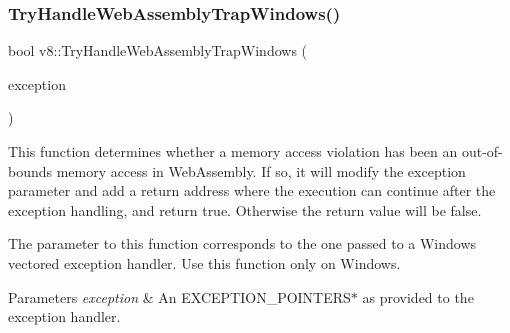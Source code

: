 \subsubsection{\texorpdfstring{Try\+Handle\+Web\+Assembly\+Trap\+Windows()}{TryHandleWebAssemblyTrapWindows()}}
{\footnotesize\ttfamily bool v8\+::\+Try\+Handle\+Web\+Assembly\+Trap\+Windows (\begin{DoxyParamCaption}\item[{E\+X\+C\+E\+P\+T\+I\+O\+N\+\_\+\+P\+O\+I\+N\+T\+E\+RS $\ast$}]{exception }\end{DoxyParamCaption})}

This function determines whether a memory access violation has been an out-\/of-\/bounds memory access in Web\+Assembly. If so, it will modify the exception parameter and add a return address where the execution can continue after the exception handling, and return true. Otherwise the return value will be false.

The parameter to this function corresponds to the one passed to a Windows vectored exception handler. Use this function only on Windows.


\begin{DoxyParams}{Parameters}
{\em exception} & An E\+X\+C\+E\+P\+T\+I\+O\+N\+\_\+\+P\+O\+I\+N\+T\+E\+R\+S$\ast$ as provided to the exception handler. \\
\hline
\end{DoxyParams}
